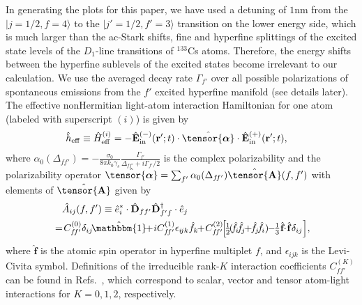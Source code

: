 \documentclass[aps,pra,twocolumn,superscriptaddress]{revtex4-1} %
\def\bra#1{\langle{#1}\rvert}%
\def\ket#1{\lvert{#1}\rangle}%
\newcommand{\smallfrac}[2]{\mbox{$\frac{#1}{#2}$}}
\newcommand{\poltens}{\hat{\tensor{\boldsymbol{\alpha}}}}
\newcommand{\charpol}{\alpha_0(\Delta_{f\!f'})}
\begin{document}
\begin{appendix}
In generating the plots for this paper, we have used a detuning of $1$nm from the $ \ket{j=1/2,f=4} $ to the $ \ket{j'=1/2,f'=3} $ transition on the lower energy side, which is much larger than the ac-Stark shifts, fine and hyperfine splittings of the excited state levels of the $ D_1 $-line transitions of $ ^{133} $Cs atoms. Therefore, the energy shifts between the hyperfine sublevels of the excited states become irrelevant to our calculation.
We use the averaged decay rate $ \Gamma_{f'} $ over all possible polarizations of spontaneous emissions from the $ f' $ excited hyperfine manifold (see details later).
The effective nonHermitian light-atom interaction Hamiltonian for one atom (labeled with superscript $ (i) $) is given by
\begin{align}
\hat{h}_{\rm eff}\equiv \hat{H}_{\rm eff}^{(i)} &= - \hat{\mathbf{E}}^{(-)}_{\rm in}(\mathbf{r}' ; t ) \cdot \poltens \cdot \hat{\mathbf{E}}^{(+)}_{\rm in}(\mathbf{r}' ;t ),
\end{align}
where $\charpol = -\frac{\sigma_0}{8\pi k_0\gamma_s}\frac{\Gamma_{f'}}{\Delta_{ff'}+i\Gamma_{f'}/2}$ is the complex polarizability and the polarizability operator $  \poltens=\sum_{f'}\charpol\hat{\tensor{\mathbf{A}}}(f,f')$ with elements of $ \hat{\tensor{\mathbf{A}}} $ given by
\begin{align} \label{Eq::PolarizabilityIrrep}
		&\quad\hat{A}_{ij}(f,f')\equiv \hat{e}_i^*\cdot\hat{\mathbf{D}}_{ff'}\hat{\mathbf{D}}_{f'f}^\dagger \cdot \hat{e}_j \\
		&=  \!C_{f\!f'}^{(0)} \delta_{ij}\!\hat{\mathbbm{1}} \!\!+\! iC_{f\!f'}^{(1)}\epsilon_{i\!jk}\hat{f}_k \!\!+\! C_{f\!f'}^{(2)}\! \Big[\! \smallfrac{1}{2}\! (\! \hat{f}\!_i\!\hat{f}\!_j \!\!+\!\! \hat{f}\!_j\!\hat{f}\!_i ) \!\!-\!\!\smallfrac{1}{3} \hat{\mathbf{f}}\!\!\cdot\!\hat{\mathbf{f}} \delta_{ij} \Big],
\end{align}
where $\hat{\mathbf{f}}$ is the atomic spin operator in hyperfine multiplet $f$, and $ \epsilon_{ijk} $ is the Levi-Civita symbol.
Definitions of the irreducible rank-$ K $ interaction coefficients $ C_{ff'}^{(K)} $ can be found in Refs.~\cite{Qi2016,Deutsch2010a}, which correspond to scalar, vector and tensor atom-light interactions for $ K=0,1,2 $, respectively.


\end{appendix}
\end{document}
